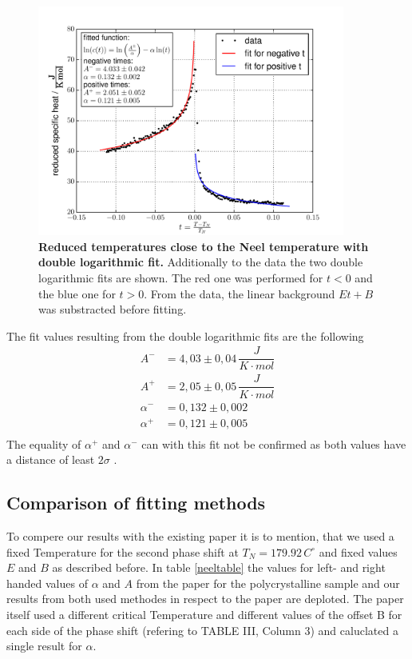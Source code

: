 \documentclass{include/thesisclass3}
\newcommand{\cc}{\cdot}
\newcommand{\e}[1]{\,\si{#1}}
\begin{document}
\begin{figure}[H]
\includegraphics[width = 0.9\textwidth]{fig/loglogfit.pdf}
\caption{\label{neelplot}\textbf{Reduced temperatures close to the Neel temperature with double logarithmic fit.} Additionally to the data the two double logarithmic fits are shown. The red one was performed for $t < 0$ and the blue one for $t > 0$. From the data, the linear background $Et +B$ was substracted before fitting.} 
\end{figure}
The fit values resulting from the double logarithmic fits are the following
\begin{align*}
A^- &= 4,03 \pm 0,04 \e{\dfrac{J}{K\cc mol}}\\
A^+ &= 2,05 \pm 0,05 \e{\dfrac{J}{K\cc mol}}\\
\alpha^- &= 0,132 \pm 0,002\\
\alpha^+ &= 0,121 \pm 0,005\\
\end{align*}
The equality of $\alpha^+$ and $\alpha^-$ can with this fit not be confirmed as both values have a distance of least $2\sigma$ .

\subsection{Comparison of fitting methods}
To compere our results with the existing paper it is to mention, that we used a fixed Temperature for the second phase shift at $T_N = 179.92\e{C^{\circ}}$ and fixed values $E$ and $B$ as described before. In table \ref{neeltable} the values for left- and right handed values of $\alpha$ and $A$ from the paper for the polycrystalline sample and our results from both used methodes in respect to the paper are deploted. The paper itself used a different critical Temperature and different values of the offset B for each side of the phase shift (refering to TABLE III, Column 3) and caluclated a single result for $\alpha$.
\end{document}
